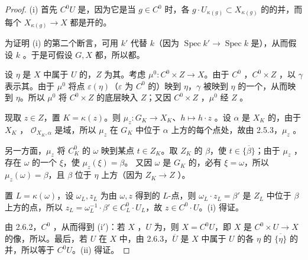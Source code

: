 \begin{proof}
(i) 首先 $C^0U$ 是，因为它是当 $g\in C^0$ 时，各 $g\cdot U_{\kappa(g)}\subset X_{\kappa(g)}$ 的的并，而每个 $X_{\kappa(g)}\to X$ 都是开的。

为证明 (i) 的第二个断言，可用 $k'$ 代替 $k$（因为 $\operatorname{Spec}k'\to\operatorname{Spec}k$ 是），从而假设 $k$ 。于是可假设 $G,X$ 都，所以都。

设 $\eta$ 是 $X$ 中属于 $U$ 的，$Z$ 为其。考虑 $\mu^0:C^0\times Z\to X$。由于 $C^0$ ，$C^0\times Z$ ，以 $\gamma$ 表示其。由于 $\mu^0$ 将点 $\varepsilon(\eta)$（$\varepsilon$ 为 $C^0$ 的）映到 $\eta$，$\gamma$ 被映到 $\eta$ 的一个，从而映到 $\eta$。所以 $\mu^0$ 将 $C^0\times Z$ 的底层映入 $Z$；又因 $C^0\times Z$ ，$\mu^0$ 经 $Z$ 。

现取 $z\in Z$，置 $K=\kappa(z)$。则 $\mu_z:G_K\to X_K$、$h\mapsto h\cdot z$ 。设 $\alpha$ 是 $X_K$ 的，由于 $X_K$ ， $\mathcal O_{X_K,\alpha}$ 是域，所以 $\mu_z$ 在 $G_K$ 中位于 $\alpha$ 上方的每个点处，故由 2.5.3，$\mu_z$ 。

另一方面，$\mu_z$ 将 $C^0_K$ 的 $\omega$ 映到某点 $t\in Z_K$。取 $Z_K$ 的 $\beta$，使 $t\in\overline{\{\beta\}}$；由于 $\mu_z$ ，存在 $\omega$ 的一个 $\xi$，使 $\mu_z(\xi)=\beta$。
又因 $\omega$ 是 $G_K$ 的，必有 $\xi=\omega$，所以 $\mu_z(\omega)=\beta$，且 $\beta$ 位于 $\eta$ 上方（因为 $Z_K\to Z$ ）。

置 $L=\kappa(\omega)$，设 $\omega_L,z_L$ 为由 $\omega,z$ 得到的 $L$-点，则 $\omega_L\cdot z_L=\beta'$ 是 $Z_L$ 中位于 $\beta$ 上方的点，所以 $z_L=\omega_L^{-1}\cdot\beta'\in C^0_L\cdot U_L$，故 $z\in C^0\cdot U$。(i) 得证。

由 2.6.2，$C^0$ ，从而得到 (i$'$)：若 $X$ ，$U$ 为，则 $X=C^0U$，即 $X$ 是 $C^0\times U\to X$ 的像，所以。最后，若 $U$ 在 $X$ 中，由 2.6.3，$\overline U$ 是 $X$ 中属于 $U$ 的各 $\eta$ 的 $\overline{\{\eta\}}$ 的并，所以等于 $C^0U$。(ii) 得证。
\end{proof}
